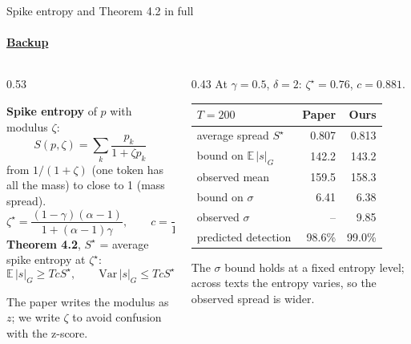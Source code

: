 \documentclass[aspectratio=169,10pt,t]{beamer}
\newcommand{\key}[1]{\textcolor{calblue}{\textbf{#1}}}
\newcommand{\quiet}[1]{\textcolor{muted}{#1}}
\newcommand{\tightmath}{%
  \setlength{\abovedisplayskip}{3pt}%
  \setlength{\belowdisplayskip}{3pt}%
  \setlength{\abovedisplayshortskip}{1pt}%
  \setlength{\belowdisplayshortskip}{1pt}%
}
\begin{document}
\begin{frame}[label=b1]{Spike entropy and Theorem 4.2 in full}
  \framesubtitle{\hyperlink{b0}{Backup}}
  \tightmath
  \begin{columns}[T,onlytextwidth]
    \begin{column}{0.53\textwidth}
      \begin{bluebox}
        \small\raggedright
        \key{Spike entropy} of $p$ with modulus $\zeta$:
        \[ S(p,\zeta) = \sum_k \frac{p_k}{1+\zeta p_k} \]
        from $1/(1+\zeta)$ (one token has all the mass) to close to 1 (mass spread).
        \[ \zeta^\star = \frac{(1-\gamma)(\alpha-1)}{1+(\alpha-1)\gamma}, \qquad c = \frac{\gamma\alpha}{1+(\alpha-1)\gamma} \]
        \key{Theorem 4.2}, $S^\star$ = average spike entropy at $\zeta^\star$:
        \[ \mathbb{E}\,|s|_G \ge T c S^\star, \qquad \mathrm{Var}\,|s|_G \le T c S^\star (1-c S^\star) \]
      \end{bluebox}
      \quiet{\scriptsize The paper writes the modulus as $z$; we write $\zeta$ to avoid confusion with the z-score.}
    \end{column}
    \begin{column}{0.43\textwidth}
      At $\gamma = 0.5$, $\delta = 2$: $\zeta^\star = 0.76$, $c = 0.881$.\par\vspace{0.4em}
      {\small
      \begin{tabular}{@{}lrr@{}}
        \toprule
        $T = 200$ & Paper & Ours \\
        \midrule
        average spread $S^\star$ & 0.807 & 0.813 \\
        bound on $\mathbb{E}\,|s|_G$ & 142.2 & 143.2 \\
        observed mean & 159.5 & 158.3 \\
        bound on $\sigma$ & 6.41 & 6.38 \\
        observed $\sigma$ & -- & 9.85 \\
        predicted detection & 98.6\% & 99.0\% \\
        \bottomrule
      \end{tabular}}
      \vspace{0.4em}

      {\small\raggedright The $\sigma$ bound holds at a fixed entropy level; across texts the entropy varies, so the observed spread is wider.\par}
    \end{column}
  \end{columns}
\end{frame}
\end{document}
